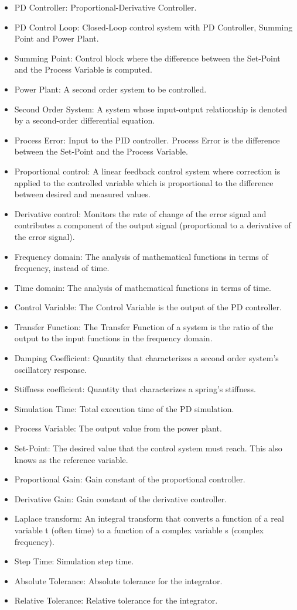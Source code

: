 \documentclass[12pt]{article}
\begin{document}
\begin{itemize}
\item{PD Controller: Proportional-Derivative Controller.}
\item{PD Control Loop: Closed-Loop control system with PD Controller, Summing Point and Power Plant.}
\item{Summing Point: Control block where the difference between the Set-Point and the Process Variable is computed.}
\item{Power Plant: A second order system to be controlled.}
\item{Second Order System: A system whose input-output relationship is denoted by a second-order differential equation.}
\item{Process Error: Input to the PID controller. Process Error is the difference between the Set-Point and the Process Variable.}
\item{Proportional control: A linear feedback control system where correction is applied to the controlled variable which is proportional to the difference between desired and measured values.}
\item{Derivative control: Monitors the rate of change of the error signal and contributes a component of the output signal (proportional to a derivative of the error signal).}
\item{Frequency domain: The analysis of mathematical functions in terms of frequency, instead of time.}
\item{Time domain: The analysis of mathematical functions in terms of time.}
\item{Control Variable: The Control Variable is the output of the PD controller.}
\item{Transfer Function: The Transfer Function of a system is the ratio of the output to the input functions in the frequency domain.}
\item{Damping Coefficient: Quantity that characterizes a second order system's oscillatory response.}
\item{Stiffness coefficient: Quantity that characterizes a spring's stiffness.}
\item{Simulation Time: Total execution time of the PD simulation.}
\item{Process Variable: The output value from the power plant.}
\item{Set-Point: The desired value that the control system must reach. This also knows as the reference variable.}
\item{Proportional Gain: Gain constant of the proportional controller.}
\item{Derivative Gain: Gain constant of the derivative controller.}
\item{Laplace transform: An integral transform that converts a function of a real variable t (often time) to a function of a complex variable s (complex frequency).}
\item{Step Time: Simulation step time.}
\item{Absolute Tolerance: Absolute tolerance for the integrator.}
\item{Relative Tolerance: Relative tolerance for the integrator.}
\end{itemize}
\end{document}
